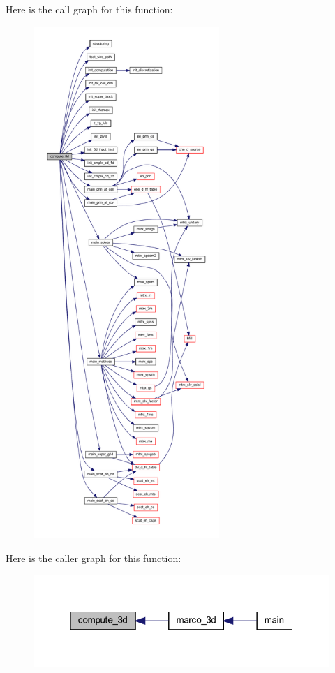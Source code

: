 Here is the call graph for this function\+:
\nopagebreak
\begin{figure}[H]
\begin{center}
\leavevmode
\includegraphics[height=550pt]{Marco_8f90_ad063b38dcbfa2382a1ed3380c8e53381_cgraph}
\end{center}
\end{figure}
Here is the caller graph for this function\+:
\nopagebreak
\begin{figure}[H]
\begin{center}
\leavevmode
\includegraphics[width=319pt]{Marco_8f90_ad063b38dcbfa2382a1ed3380c8e53381_icgraph}
\end{center}
\end{figure}
\mbox{\label{Marco_8f90_afc6a9dcc4e352b5f51fa8b7f42b6e1ad}} 
